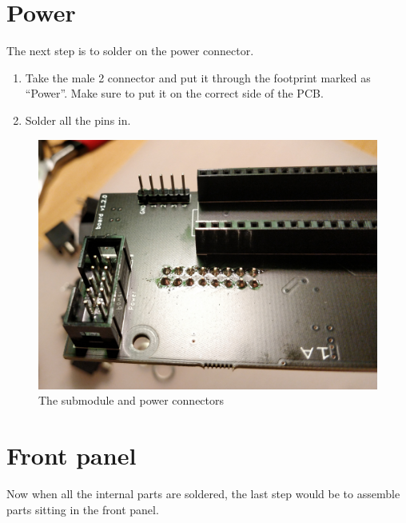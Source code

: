 \documentclass[10pt,a4paper,twocolumn]{article}
\begin{document}
\section{Power}

The next step is to solder on the power connector.

\begin{enumerate}
  \item Take the male 2 connector and put it through the footprint marked as ``Power''. Make sure to put it on the correct side of the PCB.
  \item Solder all the pins in.
\end{enumerate}

\begin{figure}[p]
  \centering
  \includegraphics[width=\linewidth]{p05.jpg}
  \caption{The submodule and power connectors}
  \label{connectors}
\end{figure}

\clearpage

\section{Front panel}

Now when all the internal parts are soldered, the last step would be to assemble parts sitting in the front panel.
\end{document}
